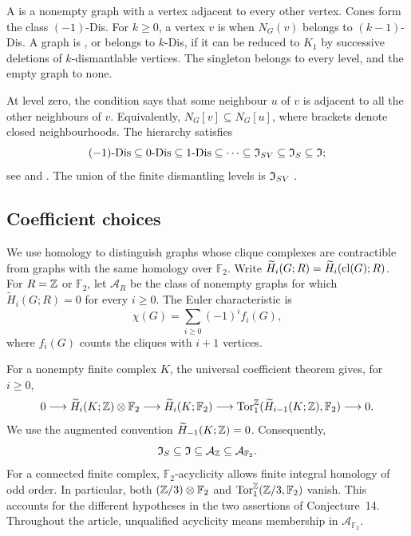 \begin{definition}\label{def:kdis}
A  is a nonempty graph with a vertex adjacent to every other
vertex. Cones form the class $(-1)$-Dis. For $k\geq0$, a vertex $v$
is  when $N_G(v)$ belongs to $(k-1)$-Dis.
A graph is , or belongs to $k$-Dis, if it can
be reduced to $K_1$ by successive deletions of $k$-dismantlable
vertices. The singleton belongs to every level, and the empty graph
to none.
\end{definition}

At level zero, the condition says that some neighbour $u$ of $v$ is
adjacent to all the other neighbours of $v$. Equivalently,
$N_G[v]\subseteq N_G[u]$, where brackets denote closed neighbourhoods.
The hierarchy satisfies
\begin{equation}\label{eq:dismantling-inclusions}
 (-1)\text{-Dis}\subseteq0\text{-Dis}\subseteq1\text{-Dis}
 \subseteq\cdots\subseteq\mathfrak I_{SV}\subseteq\mathfrak I_S\subseteq\mathfrak I;
\end{equation}
see \cite[Proposition~2]{FieuxJouve2020} and
\cite[Lemma~19 and Theorem~23]{DEFH2023}.
The union of the finite dismantling levels is $\mathfrak I_{SV}$
\cite[Theorem~23]{DEFH2023}.

\subsection{Coefficient choices}
We use homology to distinguish graphs whose clique complexes are
contractible from graphs with the same homology over $\mathbb F_2$.
Write $\widetilde H_i(G;R)=\widetilde H_i(\operatorname{cl}(G);R)$.
For $R=\mathbb Z$ or $\mathbb F_2$, let $\mathcal A_R$ be the class of
nonempty graphs for which $\widetilde H_i(G;R)=0$ for every $i\geq0$.
The Euler characteristic is
\[
 \chi(G)=\sum_{i\geq0}(-1)^if_i(G),
\]
where $f_i(G)$ counts the cliques with $i+1$ vertices.

For a nonempty finite complex $K$, the universal coefficient theorem
\cite[Theorem~3A.3]{Hatcher2002} gives, for $i\geq0$,
\begin{equation}\label{eq:uct}
 0\longrightarrow\widetilde H_i(K;\mathbb Z)\otimes\mathbb F_2
 \longrightarrow\widetilde H_i(K;\mathbb F_2)
 \longrightarrow\operatorname{Tor}^{\mathbb Z}_1
       (\widetilde H_{i-1}(K;\mathbb Z),\mathbb F_2)
 \longrightarrow0.
\end{equation}
We use the augmented convention $\widetilde H_{-1}(K;\mathbb Z)=0$.
Consequently,
\begin{equation}\label{eq:homology-inclusions}
 \mathfrak I_S\subseteq\mathfrak I\subseteq\mathcal A_{\mathbb Z}
 \subseteq\mathcal A_{\mathbb F_2}.
\end{equation}
For a connected finite complex, $\mathbb F_2$-acyclicity allows finite
integral homology of odd order. In particular, both
$(\mathbb Z/3)\otimes\mathbb F_2$ and
$\operatorname{Tor}^{\mathbb Z}_1(\mathbb Z/3,\mathbb F_2)$ vanish.
This accounts for the different hypotheses in the two assertions of
Conjecture~14. Throughout the article, unqualified acyclicity means
membership in $\mathcal A_{\mathbb F_2}$.

